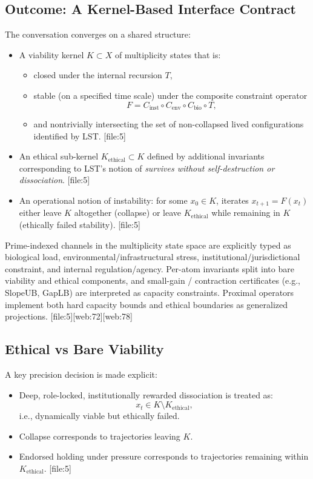 \documentclass[11pt]{article}
\begin{document}
\subsection{Outcome: A Kernel-Based Interface Contract}

The conversation converges on a shared structure:

\begin{itemize}[leftmargin=*]
  \item A viability kernel \(K\subset X\) of multiplicity states that is:
  \begin{itemize}
    \item closed under the internal recursion \(T\),
    \item stable (on a specified time scale) under the composite constraint operator
    \[
      F = C_{\text{inst}}\circ C_{\text{env}}\circ C_{\text{bio}}\circ T,
    \]
    \item and nontrivially intersecting the set of non-collapsed lived configurations identified by LST. [file:5]
  \end{itemize}
  \item An ethical sub-kernel \(K_{\text{ethical}}\subset K\) defined by additional invariants corresponding to LST's notion of \emph{survives without self-destruction or dissociation}. [file:5]
  \item An operational notion of instability: for some \(x_0\in K\), iterates \(x_{t+1} = F(x_t)\) either leave \(K\) altogether (collapse) or leave \(K_{\text{ethical}}\) while remaining in \(K\) (ethically failed stability). [file:5]
\end{itemize}

Prime-indexed channels in the multiplicity state space are explicitly typed as biological load, environmental/infrastructural stress, institutional/jurisdictional constraint, and internal regulation/agency. Per-atom invariants split into bare viability and ethical components, and small-gain / contraction certificates (e.g., SlopeUB, GapLB) are interpreted as capacity constraints. Proximal operators implement both hard capacity bounds and ethical boundaries as generalized projections. [file:5][web:72][web:78]

\subsection{Ethical vs Bare Viability}

A key precision decision is made explicit:

\begin{itemize}[leftmargin=*]
  \item Deep, role-locked, institutionally rewarded dissociation is treated as:
  \[
    x_t \in K \setminus K_{\text{ethical}},
  \]
  i.e., dynamically viable but ethically failed.
  \item Collapse corresponds to trajectories leaving \(K\).
  \item Endorsed holding under pressure corresponds to trajectories remaining within \(K_{\text{ethical}}\). [file:5]
\end{itemize}
\end{document}
